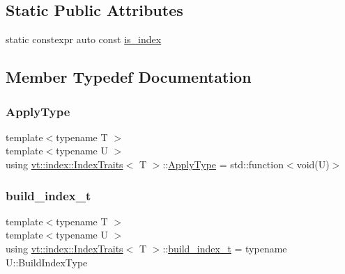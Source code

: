\subsection*{Static Public Attributes}
\begin{DoxyCompactItemize}
\item 
static constexpr auto const \hyperlink{structvt_1_1index_1_1_index_traits_a254b0c96b3b6a75e56e3d7ddd3787621}{is\+\_\+index}
\end{DoxyCompactItemize}


\subsection{Member Typedef Documentation}
\mbox{\label{structvt_1_1index_1_1_index_traits_ab13467c0c40bb0f17103d108cd08437f}} 
\subsubsection{\texorpdfstring{Apply\+Type}{ApplyType}}
{\footnotesize\ttfamily template$<$typename T $>$ \\
template$<$typename U $>$ \\
using \hyperlink{structvt_1_1index_1_1_index_traits}{vt\+::index\+::\+Index\+Traits}$<$ T $>$\+::\hyperlink{structvt_1_1index_1_1_index_traits_ab13467c0c40bb0f17103d108cd08437f}{Apply\+Type} =  std\+::function$<$void(U)$>$}

\mbox{\label{structvt_1_1index_1_1_index_traits_a8a367bc83d2a3bd52bd5007efd6ff110}} 
\subsubsection{\texorpdfstring{build\+\_\+index\+\_\+t}{build\_index\_t}}
{\footnotesize\ttfamily template$<$typename T $>$ \\
template$<$typename U $>$ \\
using \hyperlink{structvt_1_1index_1_1_index_traits}{vt\+::index\+::\+Index\+Traits}$<$ T $>$\+::\hyperlink{structvt_1_1index_1_1_index_traits_a8a367bc83d2a3bd52bd5007efd6ff110}{build\+\_\+index\+\_\+t} =  typename U\+::\+Build\+Index\+Type}

